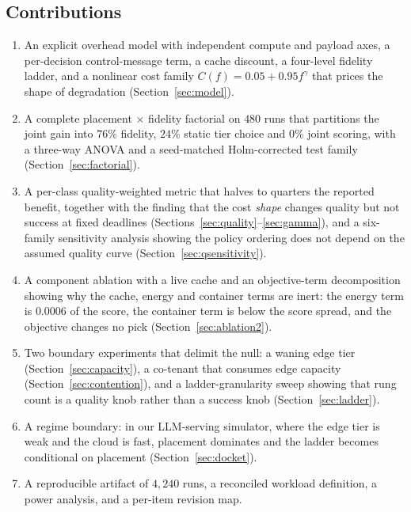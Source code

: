 \documentclass[journal,10pt]{IEEEtran}
\begin{document}
\subsection{Contributions}
\begin{enumerate}
\item An explicit overhead model with independent compute and payload axes, a
  per-decision control-message term, a cache discount, a four-level fidelity
  ladder, and a nonlinear cost family $C(f)=0.05+0.95f^\gamma$ that prices the
  shape of degradation (Section~\ref{sec:model}).
\item A complete placement $\times$ fidelity factorial on $480$ runs that
  partitions the joint gain into $76\%$ fidelity, $24\%$ static tier choice and
  $0\%$ joint scoring, with a three-way ANOVA and a seed-matched Holm-corrected
  test family (Section~\ref{sec:factorial}).
\item A per-class quality-weighted metric that halves to quarters the reported
  benefit, together with the finding that the cost \emph{shape} changes quality
  but not success at fixed deadlines
  (Sections~\ref{sec:quality}--\ref{sec:gamma}), and a six-family sensitivity
  analysis showing the policy ordering does not depend on the assumed quality
  curve (Section~\ref{sec:qsensitivity}).
\item A component ablation with a live cache and an objective-term decomposition
  showing why the cache, energy and container terms are inert: the energy term is
  $0.0006$ of the score, the container term is below the score spread, and the
  objective changes no pick (Section~\ref{sec:ablation2}).
\item Two boundary experiments that delimit the null: a waning edge tier
  (Section~\ref{sec:capacity}), a co-tenant that consumes edge capacity
  (Section~\ref{sec:contention}), and a ladder-granularity sweep showing that rung
  count is a quality knob rather than a success knob
  (Section~\ref{sec:ladder}).
\item A regime boundary: in our LLM-serving simulator, where the edge tier is
  weak and the cloud is fast, placement dominates and the ladder becomes
  conditional on placement (Section~\ref{sec:docket}).
\item A reproducible artifact of $4{,}240$ runs, a reconciled workload
  definition, a power analysis, and a per-item revision map.
\end{enumerate}

\end{document}
